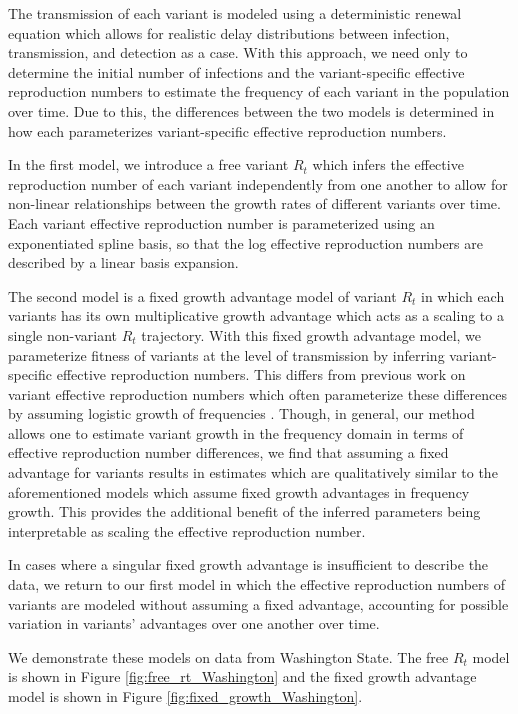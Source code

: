 \documentclass[11pt,oneside,letterpaper]{article}
\begin{document}
The transmission of each variant is modeled using a deterministic renewal equation which allows for realistic delay distributions between infection, transmission, and detection as a case.
With this approach, we need only to determine the initial number of infections and the variant-specific effective reproduction numbers to estimate the frequency of each variant in the population over time.
Due to this, the differences between the two models is determined in how each parameterizes variant-specific effective reproduction numbers.

In the first model, we introduce a free variant $R_{t}$ which infers the effective reproduction number of each variant independently from one another to allow for non-linear relationships between the growth rates of different variants over time.
Each variant effective reproduction number is parameterized using an exponentiated spline basis, so that the log effective reproduction numbers are described by a linear basis expansion.

The second model is a fixed growth advantage model of variant $R_{t}$ in which each variants has its own multiplicative growth advantage which acts as a scaling to a single non-variant $R_{t}$ trajectory.
With this fixed growth advantage model, we parameterize fitness of variants at the level of transmission by inferring variant-specific effective reproduction numbers.
This differs from previous work on variant effective reproduction numbers which often parameterize these differences by assuming logistic growth of frequencies \cite{Earnest2021, Vhringer2021}.
Though, in general, our method allows one to estimate variant growth in the frequency domain in terms of effective reproduction number differences, we find that assuming a fixed advantage for variants results in estimates which are qualitatively similar to the aforementioned models which assume fixed growth advantages in frequency growth.
This provides the additional benefit of the inferred parameters being interpretable as scaling the effective reproduction number.

In cases where a singular fixed growth advantage is insufficient to describe the data, we return to our first model in which the effective reproduction numbers of variants are modeled without assuming a fixed advantage, accounting for possible variation in variants' advantages over one another over time.

We demonstrate these models on data from Washington State.
The free $R_{t}$ model is shown in Figure \ref{fig:free_rt_Washington} and the fixed growth advantage model is shown in Figure \ref{fig:fixed_growth_Washington}.
\end{document}
